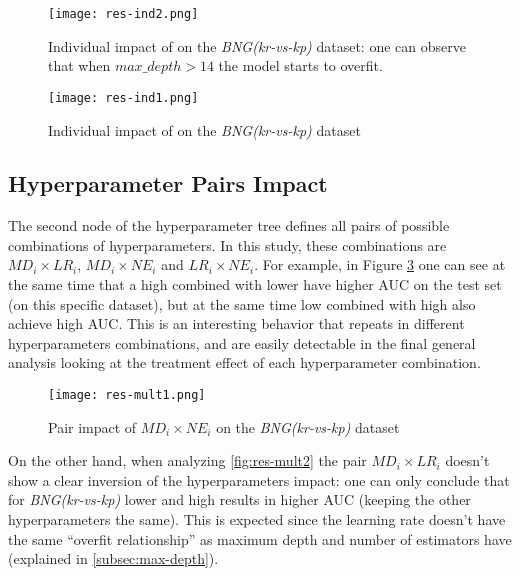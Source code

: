 \begin{figure}[!h]
    \centering
    \texttt{[image: res-ind2.png]} 
    \caption{Individual impact of \textbf{} on the \textit{BNG(kr-vs-kp)} dataset: one can observe that when $max\_depth > 14$ the model starts to overfit.}
    \label{fig:res-ind2}
\end{figure}

\begin{figure}[!h]
    \centering
    \texttt{[image: res-ind1.png]} 
    \caption{Individual impact of \textbf{} on the \textit{BNG(kr-vs-kp)} dataset}
    \label{fig:res-ind1}
\end{figure}

\subsection{Hyperparameter Pairs Impact}

The second node of the hyperparameter tree defines all pairs of possible combinations of hyperparameters. In this study, these combinations are $MD_i \times LR_i$, $MD_i \times NE_i$ and $LR_i \times NE_i$. For example, in Figure \ref{fig:res-mult1} one can see at the same time that a high \textbf{} combined with lower \textbf{} have higher AUC on the test set (on this specific dataset), but at the same time low \textbf{} combined with high \textbf{} also achieve high AUC. This is an interesting behavior that repeats in different hyperparameters combinations, and are easily detectable in the final general analysis looking at the treatment effect of each hyperparameter combination.

\begin{figure}[!h]
    \centering
    \texttt{[image: res-mult1.png]} 
    \caption{Pair impact of $MD_i \times NE_i$  on the \textit{BNG(kr-vs-kp)} dataset}
    \label{fig:res-mult1}
\end{figure}

On the other hand, when analyzing \ref{fig:res-mult2} the pair $MD_i \times LR_i$ doesn't show a clear inversion of the hyperparameters impact: one can only conclude that for \textit{BNG(kr-vs-kp)} lower \textbf{} and high \textbf{} results in higher AUC (keeping the other hyperparameters the same). This is expected since the learning rate doesn't have the same ``overfit relationship'' as maximum depth and number of estimators have (explained in \ref{subsec:max-depth}).

